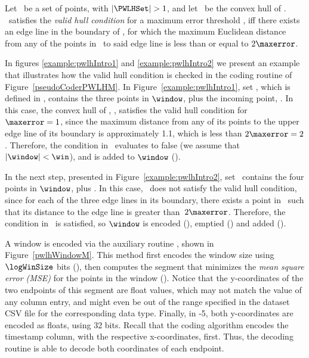 \vspace{+5pt}
\begin{defcion}
\label{def:validHull}
Let \PWLHSet\ be a set of points, with $|\PWLHSet|>1$, and let \hull\ be the convex hull of \PWLHSet. \hull\ satisfies the \textit{valid hull condition} for a maximum error threshold \maxerror, iff there exists an edge line in the boundary of \hull, for which the maximum Euclidean distance from any of the points in \hull\ to said edge line is less than or equal to $2\maxerror$.
\end{defcion}

\newcommand{\condLinePWLH}{\Line 12}
In figures \ref{example:pwlhIntro1} and \ref{example:pwlhIntro2} we present an example that illustrates how the valid hull condition is checked in the coding routine of Figure~\ref{pseudoCoderPWLHM}. In Figure~\ref{example:pwlhIntro1}, set \PWLHSet, which is defined in , contains the three points in $\window$, plus the incoming point, . In this case, the convex hull of \PWLHSet, \hull, satisfies the valid hull condition for $\maxerror = 1$, since the maximum distance from any of its points to the upper edge line of its boundary is approximately 1.1, which is less than $2\maxerror = 2$. Therefore, the condition in \condLinePWLH\ evaluates to false (we assume that $|\window|<\win$), and  is added to $\window$ ().


In the next step, presented in Figure~\ref{example:pwlhIntro2}, set \PWLHSet\ contains the four points in $\window$, plus . In this case, \hull\ does not satisfy the valid hull condition, since for each of the three edge lines in its boundary, there exists a point in \hull\ such that its distance to the edge line is greater than~$2\maxerror$. Therefore, the condition in \condLinePWLH\ is satisfied, so $\window$ is encoded (), emptied () and added  ().


\vspace{+5pt}
\examplePWLH


\vspace{+10pt}
A window is encoded via the auxiliary routine \EncodeWindow, shown in Figure~\ref{pwlhWindowM}. This method first encodes the window size using $\logWinSize$ bits (), then computes the segment that minimizes the \textit{mean square error (MSE)} for the points in the window (). Notice that the y-coordinates of the two endpoints of this segment are float values, which may not match the value of any column entry, and might even be out of the range specified in the dataset CSV file for the corresponding data type. Finally, in -5, both y-coordinates are encoded as floats, using 32 bits. Recall that the coding algorithm encodes the timestamp column, with the respective x-coordinates, first. Thus, the decoding routine is able to decode both coordinates of each endpoint.


